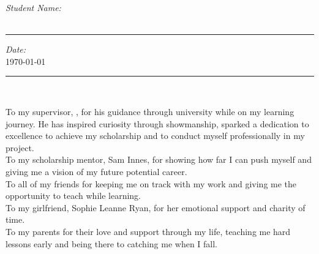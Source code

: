 \documentclass[
11pt, %
english, %
onehalfspacing, %
headsepline, %
]{MastersDoctoralThesis} %
\begin{document}
\begin{declaration}
\noindent \begin{minipage}[t]{0.5\textwidth}
	\begin{flushleft} \large
		\emph{Student Name:}\\[.4em]
		\authorname\\
		\rule[0.5em]{10em}{0.5pt}
	\end{flushleft}
\end{minipage}
\noindent \begin{minipage}[t]{0.5\textwidth}
	\begin{flushright} \large
		\emph{Date:} \\[.4em]
		\today\\
		\rule[0.5em]{10em}{0.5pt}
	\end{flushright}
\end{minipage}\\[.2em]




 

\end{declaration}

\cleardoublepage


\begin{acknowledgements}
\addchaptertocentry{\acknowledgementname} %

\vspace*{.03\textheight}

\hspace{\parindent} To my supervisor, \supname, for his guidance through university while on my learning journey. He has inspired curiosity through showmanship, sparked a dedication to excellence to achieve my scholarship and to conduct myself professionally in my project.\\

To my scholarship mentor, Sam Innes, for showing how far I can push myself and giving me a vision of my future potential career.\\

To all of my friends for keeping me on track with my work and giving me the opportunity to teach while learning.\\

To my girlfriend, Sophie Leanne Ryan, for her emotional support and charity of time.\\

To my parents for their love and support through my life, teaching me hard lessons early and being there to catching me when I fall.

\end{acknowledgements}
\end{document}
